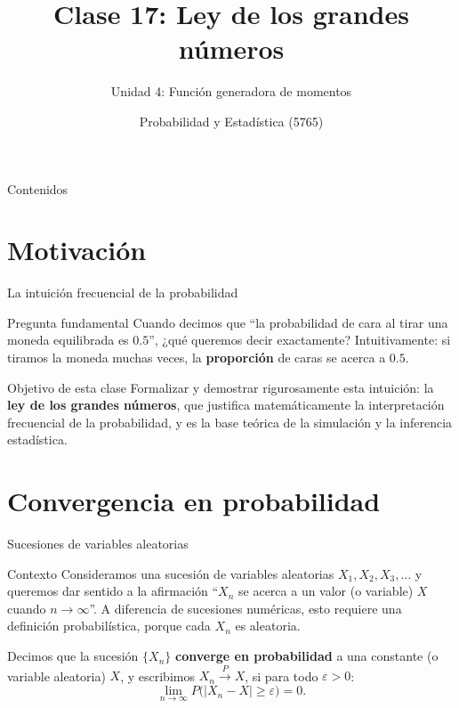 \documentclass[aspectratio=169,11pt]{beamer}
\title[Prob. y Estadística]{Clase 17: Ley de los grandes números}
\subtitle{Unidad 4: Función generadora de momentos}
\institute[UNS]{Universidad Nacional del Sur \\ Departamento de Matemática}
\author{Probabilidad y Estadística (5765)}
\date{}
\begin{document}
\begin{frame}
\titlepage
\end{frame}

\begin{frame}{Contenidos}
\tableofcontents
\end{frame}

\section{Motivación}

\begin{frame}{La intuición frecuencial de la probabilidad}
\begin{block}{Pregunta fundamental}
Cuando decimos que ``la probabilidad de cara al tirar una moneda equilibrada es $0.5$'', ¿qué queremos decir exactamente? Intuitivamente: si tiramos la moneda muchas veces, la \textbf{proporción} de caras se acerca a $0.5$.
\end{block}

\begin{alertblock}{Objetivo de esta clase}
Formalizar y demostrar rigurosamente esta intuición: la \textbf{ley de los grandes números}, que justifica matemáticamente la interpretación frecuencial de la probabilidad, y es la base teórica de la simulación y la inferencia estadística.
\end{alertblock}
\end{frame}

\section{Convergencia en probabilidad}

\begin{frame}{Sucesiones de variables aleatorias}
\begin{block}{Contexto}
Consideramos una sucesión de variables aleatorias $X_1, X_2, X_3, \dots$ y queremos dar sentido a la afirmación ``$X_n$ se acerca a un valor (o variable) $X$ cuando $n\to\infty$''. A diferencia de sucesiones numéricas, esto requiere una definición probabilística, porque cada $X_n$ es aleatoria.
\end{block}

\begin{definition}
Decimos que la sucesión $\{X_n\}$ \textbf{converge en probabilidad} a una constante (o variable aleatoria) $X$, y escribimos $X_n \xrightarrow{P} X$, si para todo $\varepsilon > 0$:
\[
\lim_{n\to\infty} P\big(|X_n - X| \geq \varepsilon\big) = 0.
\]
\end{definition}
\end{frame}
\end{document}
